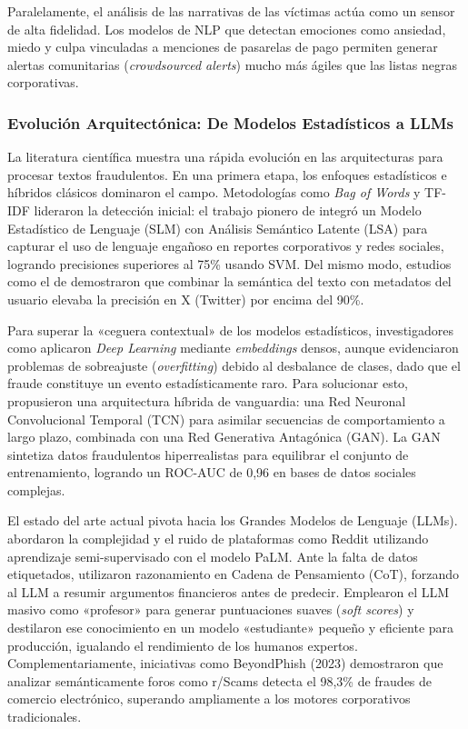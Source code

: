 Paralelamente, el análisis de las narrativas de las víctimas actúa como un sensor de alta fidelidad. Los modelos de NLP que detectan emociones como ansiedad, miedo y culpa vinculadas a menciones de pasarelas de pago permiten generar alertas comunitarias (\textit{crowdsourced alerts}) mucho más ágiles que las listas negras corporativas.

\subsubsection{Evolución Arquitectónica: De Modelos Estadísticos a LLMs}

La literatura científica muestra una rápida evolución en las arquitecturas para procesar textos fraudulentos. En una primera etapa, los enfoques estadísticos e híbridos clásicos dominaron el campo. Metodologías como \textit{Bag of Words} y TF-IDF lideraron la detección inicial: el trabajo pionero de \cite{Dong16} integró un Modelo Estadístico de Lenguaje (SLM) con Análisis Semántico Latente (LSA) para capturar el uso de lenguaje engañoso en reportes corporativos y redes sociales, logrando precisiones superiores al 75\% usando SVM. Del mismo modo, estudios como el de \cite{Gangwar22} demostraron que combinar la semántica del texto con metadatos del usuario elevaba la precisión en X (Twitter) por encima del 90\%.

Para superar la «ceguera contextual» de los modelos estadísticos, investigadores como \cite{Li23} aplicaron \textit{Deep Learning} mediante \textit{embeddings} densos, aunque evidenciaron problemas de sobreajuste (\textit{overfitting}) debido al desbalance de clases, dado que el fraude constituye un evento estadísticamente raro. Para solucionar esto, \cite{Shukla25} propusieron una arquitectura híbrida de vanguardia: una Red Neuronal Convolucional Temporal (TCN) para asimilar secuencias de comportamiento a largo plazo, combinada con una Red Generativa Antagónica (GAN). La GAN sintetiza datos fraudulentos hiperrealistas para equilibrar el conjunto de entrenamiento, logrando un ROC-AUC de 0,96 en bases de datos sociales complejas.

El estado del arte actual pivota hacia los Grandes Modelos de Lenguaje (LLMs). \cite{Deng23} abordaron la complejidad y el ruido de plataformas como Reddit utilizando aprendizaje semi-supervisado con el modelo PaLM. Ante la falta de datos etiquetados, utilizaron razonamiento en Cadena de Pensamiento (CoT), forzando al LLM a resumir argumentos financieros antes de predecir. Emplearon el LLM masivo como «profesor» para generar puntuaciones suaves (\textit{soft scores}) y destilaron ese conocimiento en un modelo «estudiante» pequeño y eficiente para producción, igualando el rendimiento de los humanos expertos. Complementariamente, iniciativas como BeyondPhish (2023) demostraron que analizar semánticamente foros como r/Scams detecta el 98,3\% de fraudes de comercio electrónico, superando ampliamente a los motores corporativos tradicionales.

